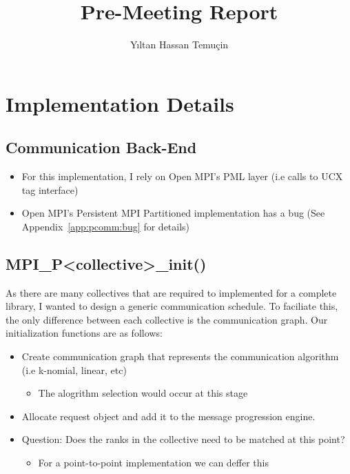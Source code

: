\documentclass{article}
\begin{document}
\frontmatter
  \title{Pre-Meeting Report}
  \author{Y{\i}ltan Hassan Temu\c{c}in}
  \maketitle
  \tableofcontents
  \mainmatter

  \section{Implementation Details}
  \subsection{Communication Back-End}
  \begin{itemize}
    \item For this implementation, I rely on Open MPI's PML layer (i.e calls to UCX tag interface)
    \item Open MPI's Persistent MPI Partitioned implementation has a bug
          (See Appendix~\ref{app:pcomm:bug} for details)
  \end{itemize}

  \subsection{MPI\_P\textless collective\textgreater\_init()}
  As there are many collectives that are required to implemented
  for a complete library, I wanted to design a generic communication schedule.
  To faciliate this,
  the only difference between each collective is the communication graph.
  Our initialization functions are as follows:
  \begin{itemize}
    \item Create communication graph that represents the communication algorithm (i.e k-nomial, linear, etc)
    \begin{itemize}
      \item The alogrithm selection would occur at this stage
    \end{itemize}
    \item Allocate request object and add it to the message progression engine.
    \item {\color{red} Question:} Does the ranks in the collective need to be matched at this point?
    \begin{itemize}
      \item For a point-to-point implementation we can deffer this
    \end{itemize}
  \end{itemize}
\end{document}
